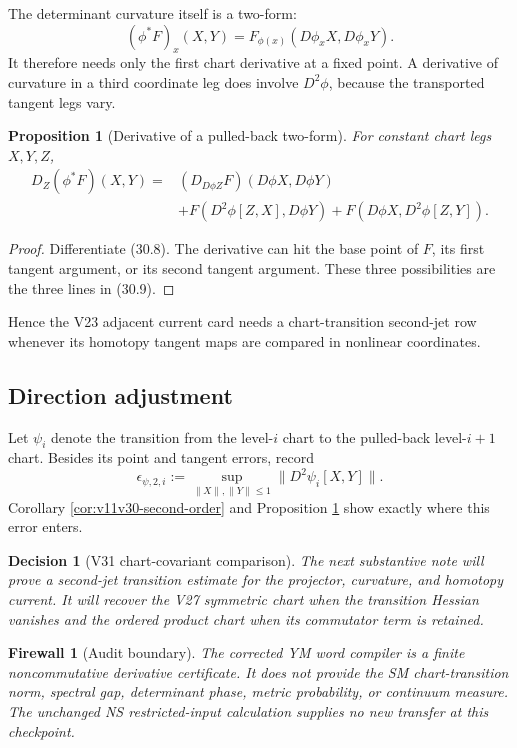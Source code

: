 \documentclass[11pt]{article}
\newtheorem{proposition}[theorem]{Proposition}
\newtheorem{firewall}[theorem]{Firewall}
\newtheorem{decision}[theorem]{Decision}
\begin{document}
The determinant curvature itself is a two-form:
\[
 (\phi^*F)_x(X,Y)
 =
 F_{\phi(x)}(D\phi_xX,D\phi_xY).
 \tag{30.8}
\]
It therefore needs only the first chart derivative at a fixed point.
A derivative of curvature in a third coordinate leg does involve
\(D^2\phi\), because the transported tangent legs vary.

\begin{proposition}[Derivative of a pulled-back two-form]
\label{prop:v11v30-pullback-response}
For constant chart legs \(X,Y,Z\),
\[
 \begin{split}
 D_Z(\phi^*F)(X,Y)
 ={}&
 (D_{D\phi Z}F)(D\phi X,D\phi Y)\\
 &+F(D^2\phi[Z,X],D\phi Y)
 +F(D\phi X,D^2\phi[Z,Y]).
 \end{split}
 \tag{30.9}
\]
\end{proposition}

\begin{proof}
Differentiate (30.8).  The derivative can hit the base point of \(F\),
its first tangent argument, or its second tangent argument.  These three
possibilities are the three lines in (30.9).
\end{proof}

Hence the V23 adjacent current card needs a chart-transition second-jet
row whenever its homotopy tangent maps are compared in nonlinear
coordinates.

\subsection{Direction adjustment}

Let \(\psi_i\) denote the transition from the level-\(i\) chart to the
pulled-back level-\(i+1\) chart.  Besides its point and tangent errors,
record
\[
 \epsilon_{\psi,2,i}
 :=
 \sup_{\|X\|,\|Y\|\leq1}
 \|D^2\psi_i[X,Y]\|.
 \tag{30.10}
\]
Corollary \ref{cor:v11v30-second-order} and Proposition
\ref{prop:v11v30-pullback-response} show exactly where this error enters.

\begin{decision}[V31 chart-covariant comparison]
\label{dec:v11v30-next}
The next substantive note will prove a second-jet transition estimate
for the projector, curvature, and homotopy current.  It will recover the
V27 symmetric chart when the transition Hessian vanishes and the ordered
product chart when its commutator term is retained.
\end{decision}

\begin{firewall}[Audit boundary]
\label{fw:v11v30-boundary}
The corrected YM word compiler is a finite noncommutative derivative
certificate.  It does not provide the SM chart-transition norm,
spectral gap, determinant phase, metric probability, or continuum
measure.  The unchanged NS restricted-input calculation supplies no new
transfer at this checkpoint.
\end{firewall}
\end{document}
